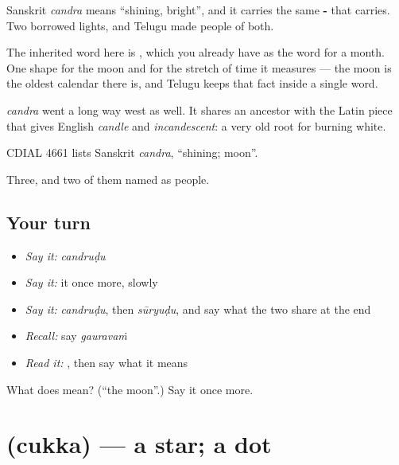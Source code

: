 Sanskrit \emph{candra} means \textquotedblleft{}shining, bright\textquotedblright{}, and it carries the same \textbf{-} that  carries. Two borrowed lights, and Telugu made people of both.

The inherited word here is , which you already have as the word for a month. One shape for the moon and for the stretch of time it measures — the moon is the oldest calendar there is, and Telugu keeps that fact inside a single word.

\emph{candra} went a long way west as well. It shares an ancestor with the Latin piece that gives English \emph{candle} and \emph{incandescent}: a very old root for burning white.

CDIAL 4661 lists Sanskrit \emph{candra}, \textquotedblleft{}shining; moon\textquotedblright{}.

\begin{grammarlens}[title={What you've built}]
Three, and two of them named as people.
\end{grammarlens}

\subsection*{Your turn}
\begin{itemize}
\raggedright
  \item \emph{Say it:} \emph{candruḍu}
  \item \emph{Say it:} it once more, slowly
  \item \emph{Say it:} \emph{candruḍu}, then \emph{sūryuḍu}, and say what the two share at the end
  \item \emph{Recall:} say \emph{gauravaṁ}
  \item \emph{Read it:} \textbf{}, then say what it means
\end{itemize}

\begin{tcolorbox}[breakable,colback=teal!4,colframe=teal!35!black,title={Before you move on}]
What does  mean? (\textquotedblleft{}the moon\textquotedblright{}.) Say it once more.
\end{tcolorbox}
\section[\texorpdfstring{\te{చుక్క} (cukka)}{చుక్క (cukka)}]{ (cukka) — a star; a dot}

\label{lesson:TE-C53-star}



